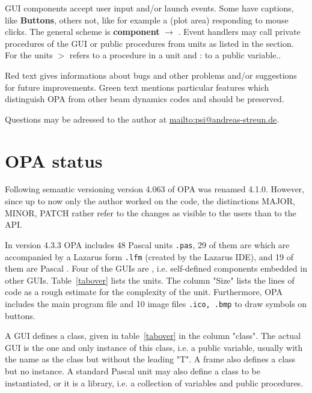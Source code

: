 \documentclass[12pt]{article}
\newcommand\code[1]{{\tt #1}}
\newcommand{\ofld}[1]{\colorbox{black!15}{{{\color{black}\bf #1}}}}
\newcommand{\ofldx}[1]{\colorbox{black!15}{{\color{black}(#1)}}}
\newcommand\guico[1]{{\color{blue}\code{#1}}}
\newcommand{\unico}[1]{{\color{burntorange}\code{#1}}}
\newcommand{\evcod}[2]{\ofld{#1} $\rightarrow$ \guico{#2}}
\newcommand{\prcod}[2]{\opauni{#1}$>$\unico{#2}}
\newcommand{\vrcod}[2]{\opauni{#1}:\unico{#2}}
\newcommand{\opagui}[1]{\colorbox{blue!20}{{\color{black}\code{#1}}}}
\newcommand{\opaguif}[1]{\colorbox{violet!30}{{\color{black}\code{#1}}}}
\newcommand{\opauni}[1]{\colorbox{orange!30}{{\color{black}\code{#1}}}}
\newcommand{\ouni}[1]{\hyperref[#1]{\opauni{#1}}}
\newcommand{\todo}[1]{{\color{red} #1}}
\newcommand{\feature}[1]{{\color{cadmiumgreen} #1}}
\begin{document}
GUI components accept user input and/or launch events. Some have captions, like \ofld{Buttons}, others not, like for example a \ofldx{plot area} responding to mouse clicks. The general scheme is \evcod{component}{event handler}. Event handlers may call private procedures of the GUI or public procedures from units as listed in the \guico{uses} section. For the units \prcod{unit}{procedure} refers to a procedure in a unit and \vrcod{unit}{variable} to a public variable..

\todo{Red text gives informations about bugs and other problems and/or suggestions for future improvements.} \feature{Green text mentions particular features which distinguish OPA from other beam dynamics codes and should be preserved.}

Questions may be adressed to the author at \url{mailto:psi@andreas-streun.de}.

\newpage


\section{OPA status}

Following semantic versioning \cite{semver} version 4.063 of OPA was renamed 4.1.0. However, since up to now only the author worked on the code, the distinctions MAJOR, MINOR, PATCH rather refer to the changes as visible to the users than to the API. 

In version 4.3.3 OPA includes 48 Pascal units \code{.pas}, 29 of them are \opagui{GUIs} which are accompanied by a Lazarus form \code{.lfm} (created by the Lazarus IDE), and 19 of them are Pascal \opauni{units}. Four of the GUIs are \opaguif{frames}, i.e. self-defined components embedded in other GUIs.
Table~\ref{tabover} lists the units. The column "Size" lists the lines of code as a rough estimate for the complexity of the unit. Furthermore, OPA includes the main program file \ouni{{opa.lpr}} and 10 image files \code{.ico, .bmp} to draw symbols on buttons. 

A GUI defines a class, given in table~\ref{tabover} in the column "class". The actual GUI is the one and only instance of this class, i.e. a public variable, usually with the name as the class but without the leading "T". A frame also defines a class but no instance.
A standard Pascal unit may also define a class to be instantiated, or it is a library, i.e. a collection of variables and public procedures.
\end{document}
